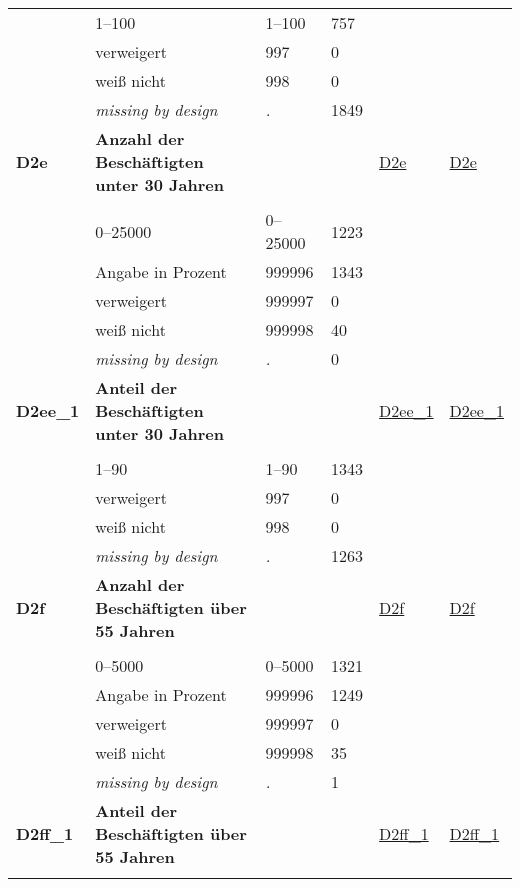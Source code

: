\begin{longtable}{| L{2.45cm} | L{6cm} | C{1.5cm} | R{1cm} | C{2.25cm} | C{2.25cm} |}
   & 1--100 & 1--100 & 757 &  &  \\ 
   & verweigert & 997 & 0 &  &  \\ 
   & weiß nicht & 998 & 0 &  &  \\ 
   & \textit{missing by design} & \textit{.} & 1849 &  &  \\ 
   \midrule
\textbf{D2e}\label{var:D2e} & \textbf{Anzahl der Beschäftigten unter 30 Jahren} &  &  & \hyperref[D2e]{D2e} & \hyperref[var:suf:D2e]{D2e} \\ 
   &  &  &  &  &  \\ 
   & 0--25000 & 0--25000 & 1223 &  &  \\ 
   & Angabe in Prozent & 999996 & 1343 &  &  \\ 
   & verweigert & 999997 & 0 &  &  \\ 
   & weiß nicht & 999998 & 40 &  &  \\ 
   & \textit{missing by design} & \textit{.} & 0 &  &  \\ 
   \midrule
\textbf{D2ee\_1}\label{var:D2ee:1} & \textbf{Anteil der Beschäftigten unter 30 Jahren} &  &  & \hyperref[D2ee:1]{D2ee\_1} & \hyperref[var:suf:D2ee:1]{D2ee\_1} \\ 
   &  &  &  &  &  \\ 
   & 1--90 & 1--90 & 1343 &  &  \\ 
   & verweigert & 997 & 0 &  &  \\ 
   & weiß nicht & 998 & 0 &  &  \\ 
   & \textit{missing by design} & \textit{.} & 1263 &  &  \\ 
   \midrule
\textbf{D2f}\label{var:D2f} & \textbf{Anzahl der Beschäftigten über 55 Jahren} &  &  & \hyperref[D2f]{D2f} & \hyperref[var:suf:D2f]{D2f} \\ 
   &  &  &  &  &  \\ 
   & 0--5000 & 0--5000 & 1321 &  &  \\ 
   & Angabe in Prozent & 999996 & 1249 &  &  \\ 
   & verweigert & 999997 & 0 &  &  \\ 
   & weiß nicht & 999998 & 35 &  &  \\ 
   & \textit{missing by design} & \textit{.} & 1 &  &  \\ 
   \midrule
\textbf{D2ff\_1}\label{var:D2ff:1} & \textbf{Anteil der Beschäftigten über 55 Jahren} &  &  & \hyperref[D2ff:1]{D2ff\_1} & \hyperref[var:suf:D2ff:1]{D2ff\_1} \\ 
   &  &  &  &  &  \\ 

\end{longtable}
